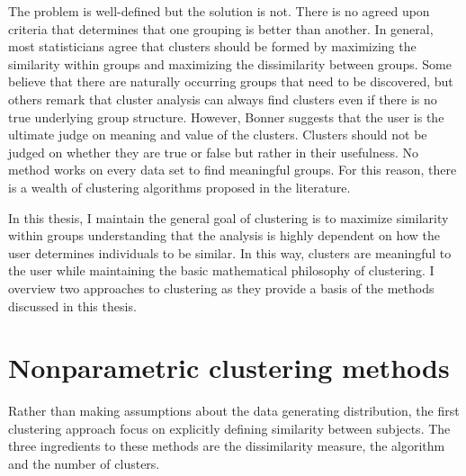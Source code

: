 The problem is well-defined but the solution is not. There is no agreed upon criteria that determines that one grouping is better than another. In general, most statisticians agree that clusters should be formed by maximizing the similarity within groups and maximizing the dissimilarity between groups. Some believe that there are naturally occurring groups that need to be discovered, but others remark that cluster analysis can always find clusters even if there is no true underlying group structure. However, Bonner \cite{bonner1964} suggests that the user is the ultimate judge on meaning and value of the clusters. Clusters should not be judged on whether they are true or false but rather in their usefulness. No method works on every data set to find meaningful groups. For this reason, there is a wealth of clustering algorithms proposed in the literature. 

In this thesis, I maintain the general goal of clustering is to maximize similarity within groups understanding that the analysis is highly dependent on how the user determines individuals to be similar. In this way, clusters are meaningful to the user while maintaining the basic mathematical philosophy of clustering.  I overview two approaches to clustering as they provide a basis of the methods discussed in this thesis. 

\section{Nonparametric clustering methods}
Rather than making assumptions about the data generating distribution, the first clustering approach focus on explicitly defining similarity between subjects. The three ingredients to these methods are the dissimilarity measure, the algorithm and the number of clusters.

